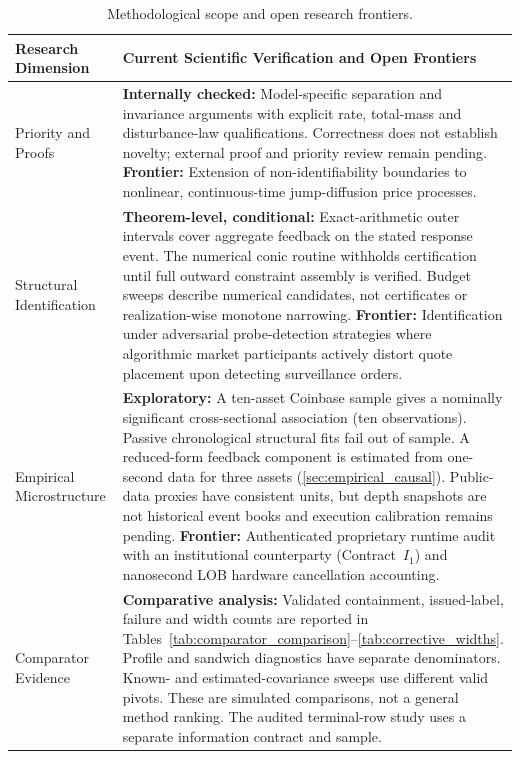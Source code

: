 \documentclass[10pt,twocolumn,letterpaper]{article}
\theoremstyle{definition}
\theoremstyle{remark}
\begin{document}
\begin{table}[htbp]
\centering\small
\caption{Methodological scope and open research frontiers.}\label{tab:research_gates}
\begin{tabularx}{\textwidth}{>{\raggedright\arraybackslash}p{}X}
\toprule
\textbf{Research Dimension} & \textbf{Current Scientific Verification and Open Frontiers} \\
\midrule
Priority and Proofs & \textbf{Internally checked:} Model-specific separation and invariance arguments with explicit rate, total-mass and disturbance-law qualifications. Correctness does not establish novelty; external proof and priority review remain pending.\newline
\textbf{Frontier:} Extension of non-identifiability boundaries to nonlinear, continuous-time jump-diffusion price processes. \\
\midrule
Structural Identification & \textbf{Theorem-level, conditional:} Exact-arithmetic outer intervals cover aggregate feedback on the stated response event. The numerical conic routine withholds certification until full outward constraint assembly is verified. Budget sweeps describe numerical candidates, not certificates or realization-wise monotone narrowing.\newline
\textbf{Frontier:} Identification under adversarial probe-detection strategies where algorithmic market participants actively distort quote placement upon detecting surveillance orders. \\
\midrule
Empirical Microstructure & \textbf{Exploratory:} A ten-asset Coinbase sample gives a nominally significant cross-sectional association (ten observations). Passive chronological structural fits fail out of sample. A reduced-form feedback component is estimated from one-second data for three assets (\cref{sec:empirical_causal}). Public-data proxies have consistent units, but depth snapshots are not historical event books and execution calibration remains pending.\newline
\textbf{Frontier:} Authenticated proprietary runtime audit with an institutional counterparty (Contract~$I_1$) and nanosecond LOB hardware cancellation accounting. \\
\midrule
Comparator Evidence & \textbf{Comparative analysis:} Validated containment, issued-label, failure and width counts are reported in Tables~\ref{tab:comparator_comparison}--\ref{tab:corrective_widths}. Profile and sandwich diagnostics have separate denominators. Known- and estimated-covariance sweeps use different valid pivots. These are simulated comparisons, not a general method ranking. The audited terminal-row study uses a separate information contract and sample.\newline

\end{tabularx}
\end{table}
\end{document}
